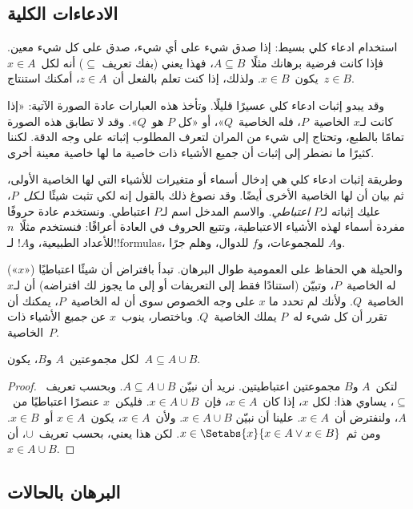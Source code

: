 \documentclass[../../../include/open-logic-section]{subfiles}
\begin{document}
\subsection{الادعاءات الكلية}

استخدام ادعاء كلي بسيط: إذا صدق شيء على أي شيء، صدق على كل شيء معين.
فإذا كانت فرضية برهانك مثلًا~$A \subseteq B$، فهذا يعني (بفك تعريف
$\subseteq$) أنه لكل~$x \in A$ يكون~$x \in B$. ولذلك، إذا كنت تعلم
بالفعل أن~$z \in A$، أمكنك استنتاج~$z \in B$.

وقد يبدو إثبات ادعاء كلي عسيرًا قليلًا. وتأخذ هذه العبارات عادة
الصورة الآتية: «إذا كانت لـ$x$ الخاصية~$P$، فله الخاصية~$Q$»، أو «كل
$P$ هو~$Q$». وقد لا تطابق هذه الصورة تمامًا بالطبع، وتحتاج إلى شيء
من المران لتعرف المطلوب إثباته على وجه الدقة. لكننا كثيرًا ما نضطر
إلى إثبات أن جميع الأشياء ذات خاصية ما لها خاصية معينة أخرى.

وطريقة إثبات ادعاء كلي هي إدخال أسماء أو متغيرات للأشياء التي لها
الخاصية الأولى، ثم بيان أن لها الخاصية الأخرى أيضًا. وقد نصوغ ذلك
بالقول إنه لكي تثبت شيئًا لـ\emph{كل}~$P$، عليك إثباته لـ$P$
\emph{اعتباطي}. والاسم المدخل اسم لـ$P$ اعتباطي. ونستخدم عادة حروفًا
مفردة أسماء لهذه الأشياء الاعتباطية، وتتبع الحروف في العادة أعرافًا:
فنستخدم مثلًا~$n$ للأعداد الطبيعية، و$!A$ لـ!!{formula}s، و$A$
للمجموعات، و$f$ للدوال، وهلم جرًا.

والحيلة هي الحفاظ على العمومية طوال البرهان. تبدأ بافتراض أن شيئًا
اعتباطيًا («$x$») له الخاصية~$P$، وتبيّن (استنادًا فقط إلى التعريفات
أو إلى ما يجوز لك افتراضه) أن لـ$x$ الخاصية~$Q$. ولأنك لم تحدد ما
$x$ على وجه الخصوص سوى أن له الخاصية~$P$، يمكنك أن تقرر أن كل شيء
له~$P$ يملك الخاصية~$Q$. وباختصار، ينوب~$x$ عن \emph{جميع} الأشياء
ذات الخاصية~$P$.

\begin{prop}
  لكل مجموعتين~$A$ و$B$، يكون~$A \subseteq A \cup B$.
\end{prop}

\begin{proof}
  لتكن~$A$ و$B$ مجموعتين اعتباطيتين. نريد أن نبيّن
  $A \subseteq A \cup B$. وبحسب تعريف~$\subseteq$، يساوي هذا: لكل
  $x$، إذا كان~$x \in A$، فإن~$x \in A \cup B$. فليكن~$x$
  عنصرًا اعتباطيًا من~$A$، ولنفترض أن~$x \in A$. علينا أن نبيّن
  $x \in A \cup B$. ولأن~$x \in A$، يكون~$x \in A$ أو~$x \in B$.
  ومن ثم~$x \in \Setabs{x}{x \in A \lor x \in B}$. لكن هذا يعني،
  بحسب تعريف~$\cup$، أن~$x \in A \cup B$.
\end{proof}


\subsection{البرهان بالحالات}
\end{document}

